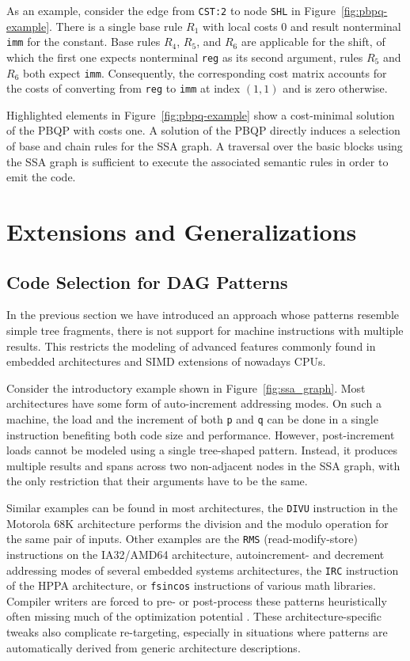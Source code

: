 As an example, consider the edge from \texttt{CST:2} to node
\texttt{SHL} in Figure~\ref{fig:pbpq-example}. There is a single base
rule $R_1$ with local costs 0 and result nonterminal \texttt{imm} for
the constant. Base rules $R_4$, $R_5$, and $R_6$ are applicable for
the shift, of which the first one expects nonterminal \texttt{reg} as
its second argument, rules $R_5$ and $R_6$ both expect
\texttt{imm}. Consequently, the corresponding cost matrix accounts for
the costs of converting from \texttt{reg} to \texttt{imm} at index
$(1,1)$ and is zero otherwise.

Highlighted elements in Figure~\ref{fig:pbpq-example} show a
cost-minimal solution of the PBQP with costs one. A solution of the
PBQP directly induces a selection of base and chain rules for the SSA
graph. A traversal over the basic blocks using the SSA graph is
sufficient to execute the associated semantic rules in order to emit
the code.

\section{Extensions and Generalizations}

\subsection{Code Selection for DAG Patterns}
\label{sec:dag_patterns}
In the previous section we have introduced an approach whose
patterns resemble simple tree fragments, \eg there is not support for
machine instructions with multiple results. This restricts the
modeling of advanced features commonly found in embedded
architectures and SIMD extensions of nowadays CPUs.

Consider the introductory example shown
in Figure~\ref{fig:ssa_graph}. Most architectures have some form of
auto-increment addressing modes. On such a machine, the load and the
increment of both \texttt{p} and \texttt{q} can be done in a single
instruction benefiting both code size and performance. However,
post-increment loads cannot be modeled using a single tree-shaped
pattern. Instead, it produces multiple results and spans across two
non-adjacent nodes in the SSA graph, with the only restriction that
their arguments have to be the same.

Similar examples can be found in most architectures, \eg the
\texttt{DIVU} instruction in the Motorola 68K architecture performs
the division and the modulo operation for the same pair of
inputs. Other examples are the \texttt{RMS} (read-modify-store)
instructions on the IA32/AMD64 architecture, autoincrement- and
decrement addressing modes of several embedded systems architectures,
the \texttt{IRC} instruction of the HPPA architecture, or
\texttt{fsincos} instructions of various math libraries. Compiler
writers are forced to pre- or post-process these patterns
heuristically often missing much of the optimization potential
\cite{Ebner08}. These architecture-specific tweaks also complicate
re-targeting, especially in situations where patterns are
automatically derived from generic architecture descriptions.

